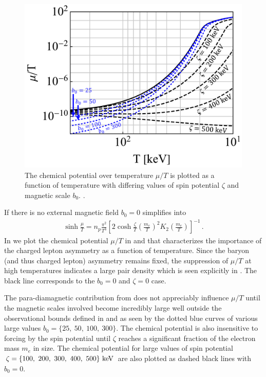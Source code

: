 \begin{figure}
 \centering
\includegraphics[width=0.8\linewidth]{plots/thesis_chempot_fixed.pdf}
 \caption{The chemical potential over temperature $\mu/T$ is plotted as a function of temperature with differing values of spin potential $\zeta$ and magnetic scale $b_{0}$. . }
 \label{fig:chemicalpotential}
\end{figure}

If there is no external magnetic field $b_{0}=0$  simplifies into
\begin{align}
 \label{simpchem:1}
 \sinh\frac{\mu}{T}=n_{p}\frac{\pi^{2}}{T^{3}}\left[2\cosh\frac{\zeta}{T}\left(\frac{m_{e}}{T}\right)^{2}K_{2}\left(\frac{m_{e}}{T}\right)\right]^{-1}\,.
\end{align}
In  we plot the chemical potential $\mu/T$ in  and  that characterizes the importance of the charged lepton asymmetry as a function of temperature. Since the baryon (and thus charged lepton) asymmetry remains fixed, the suppression of $\mu/T$ at high temperatures indicates a large pair density which is seen explicitly in . The black line corresponds to the $b_{0}=0$ and $\zeta=0$ case. 

The para-diamagnetic contribution from  does not appreciably influence $\mu/T$ until the magnetic scales involved become incredibly large well outside the observational bounds defined in  and  as seen by the dotted blue curves of various large values $b_{0}=\{25,\ 50,\ 100,\ 300\}$. The chemical potential is also insensitive to forcing by the spin potential until $\zeta$ reaches a significant fraction of the electron mass $m_{e}$ in size. The chemical potential for large values of spin potential $\zeta=\{100,\ 200,\ 300,\ 400,\ 500\}\,\text{\,keV}$ are also plotted as dashed black lines with $b_{0}=0$.

